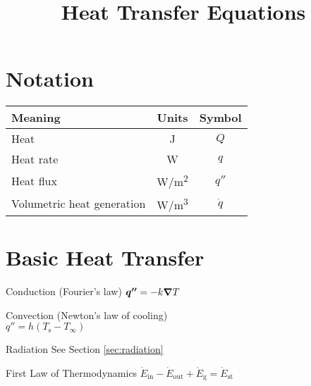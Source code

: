 \documentclass{article}
\title{Heat Transfer Equations}
\begin{document}


\begin{multicols}{2}
\setlength{\columnseprule}{0.5pt}

\section{Notation}
\begin{tabu}{lcc}
  \toprule
  Meaning & Units & Symbol \\
  \midrule
  Heat & \si{\joule} & $Q$ \\
  Heat rate & \si{\watt} & $q$ \\
  Heat flux & \si[per-mode=symbol]{\watt\per\square\meter} & $q''$ \\
  Volumetric heat generation & \si[per-mode=symbol]{\watt\per\cubic\meter} & $\dot q$ \\
  \bottomrule
\end{tabu}

\section{Basic Heat Transfer}

\begin{description*}
\item[Conduction (Fourier's law)]
  \(\bm{q''} = -k \bm{\nabla} T\)
\item[Convection (Newton's law of cooling)]~\\
  \(q'' = h(T_\mathrm{s}-T_\infty)\)
\item[Radiation] See Section \ref{sec:radiation}
\item[First Law of Thermodynamics]
  \(\dot{E}_\mathrm{in}-\dot{E}_\mathrm{out}+\dot{E}_\mathrm{g} = \dot{E}_\mathrm{st}\)
\end{description*}


\end{multicols}
\end{document}
